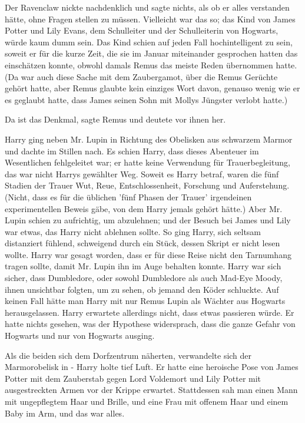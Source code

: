 Der Ravenclaw nickte nachdenklich und sagte nichts, als ob er alles verstanden
hätte, ohne Fragen stellen zu müssen. Vielleicht war das so; das Kind von James
Potter und Lily Evans, dem Schulleiter und der Schulleiterin von Hogwarts, würde
kaum dumm sein. Das Kind schien auf jeden Fall hochintelligent zu sein, soweit
er für die kurze Zeit, die sie im Januar miteinander gesprochen hatten das
einschätzen konnte, obwohl damals Remus das meiste Reden übernommen hatte. (Da
war auch diese Sache mit dem Zaubergamot, über die Remus Gerüchte gehört hatte,
aber Remus glaubte kein einziges Wort davon, genauso wenig wie er es geglaubt
hatte, dass James seinen Sohn mit Mollys Jüngster verlobt hatte.)

\glqq Da ist das Denkmal\grqq{}, sagte Remus und deutete vor ihnen her.

Harry ging neben Mr. Lupin in Richtung des Obelisken aus schwarzem Marmor und
dachte im Stillen nach. Es schien Harry, dass dieses Abenteuer im Wesentlichen
fehlgeleitet war; er hatte keine Verwendung für Trauerbegleitung, das war nicht
Harrys gewählter Weg. Soweit es Harry betraf, waren die fünf Stadien der Trauer
Wut, Reue, Entschlossenheit, Forschung und Auferstehung. (Nicht, dass es für die
üblichen 'fünf Phasen der Trauer' irgendeinen experimentellen Beweis gäbe, von
dem Harry jemals gehört hätte.) Aber Mr. Lupin schien zu aufrichtig, um
abzulehnen; und der Besuch bei James und Lily war etwas, das Harry nicht
ablehnen sollte. So ging Harry, sich seltsam distanziert fühlend, schweigend
durch ein Stück, dessen Skript er nicht lesen wollte. Harry war gesagt worden,
dass er für diese Reise nicht den Tarnumhang tragen sollte, damit Mr. Lupin ihn
im Auge behalten konnte. Harry war sich sicher, dass Dumbledore, oder sowohl
Dumbledore als auch Mad-Eye Moody, ihnen unsichtbar folgten, um zu sehen, ob
jemand den Köder schluckte. Auf keinen Fall hätte man Harry mit nur Remus Lupin
als Wächter aus Hogwarts herausgelassen. Harry erwartete allerdings nicht, dass
etwas passieren würde. Er hatte nichts gesehen, was der Hypothese widersprach,
dass die ganze Gefahr von Hogwarts und nur von Hogwarts ausging.

Als die beiden sich dem Dorfzentrum näherten, verwandelte sich der Marmorobelisk
in - Harry holte tief Luft. Er hatte eine heroische Pose von James Potter mit
dem Zauberstab gegen Lord Voldemort und Lily Potter mit ausgestreckten Armen vor
der Krippe erwartet. Stattdessen sah man einen Mann mit ungepflegtem Haar und
Brille, und eine Frau mit offenem Haar und einem Baby im Arm, und das war alles.

